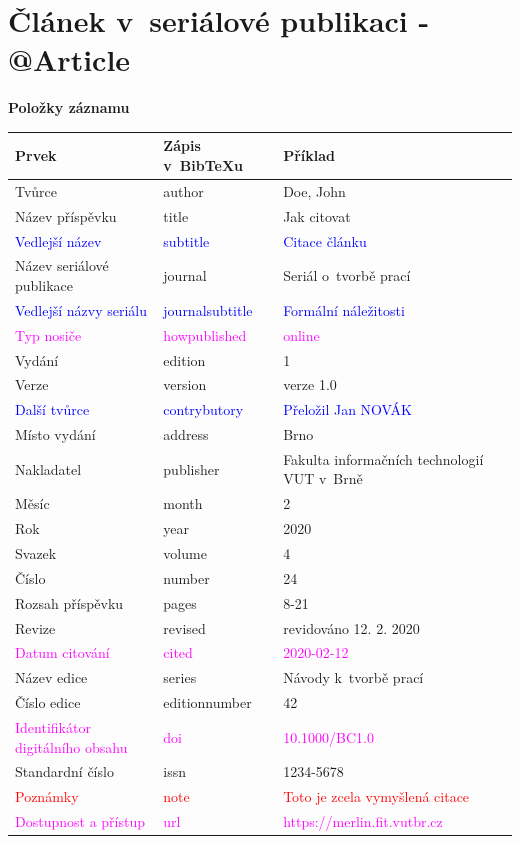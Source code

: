 \section*{Článek v~seriálové publikaci - @Article}
\label{pr-casopis-clanek}
\noindent \textbf{Položky záznamu}

\medskip

\begin{tabularx}{\linewidth}{X X X}
    Prvek & Zápis v~BibTeXu & Příklad \\\hline
    Tvůrce & author & Doe, John\\
    Název příspěvku & title & Jak citovat\\
    \textcolor{blue}{Vedlejší název} & \textcolor{blue}{subtitle} & \textcolor{blue}{Citace článku}\\
    Název seriálové publikace & journal & Seriál o~tvorbě prací\\
    \textcolor{blue}{Vedlejší názvy seriálu} & \textcolor{blue}{journalsubtitle} & \textcolor{blue}{Formální náležitosti}\\
    \textcolor{magenta}{Typ nosiče} & \textcolor{magenta}{howpublished} & \textcolor{magenta}{online}\\
    Vydání & edition & 1\\
    Verze & version & verze 1.0\\
    \textcolor{blue}{Další tvůrce} & \textcolor{blue}{contrybutory} & \textcolor{blue}{Přeložil Jan NOVÁK}\\
    Místo vydání & address & Brno\\
    Nakladatel & publisher & Fakulta informačních technologií VUT v~Brně\\
    Měsíc & month & 2\\
    Rok & year & 2020\\
    Svazek & volume & 4\\
    Číslo & number & 24\\
    Rozsah příspěvku & pages & 8-21\\
    Revize & revised & revidováno 12. 2. 2020\\
    \textcolor{magenta}{Datum citování} & \textcolor{magenta}{cited} & \textcolor{magenta}{2020-02-12}\\
    Název edice & series & Návody k~tvorbě prací\\
    Číslo edice & editionnumber & 42\\
    \textcolor{magenta}{Identifikátor digitálního obsahu} & \textcolor{magenta}{doi} & \textcolor{magenta}{10.1000/BC1.0}\\
    Standardní číslo  & issn & 1234-5678\\
    \textcolor{red}{Poznámky} & \textcolor{red}{note} & \textcolor{red}{Toto je zcela vymyšlená citace}\\
    \textcolor{magenta}{Dostupnost a přístup} & \textcolor{magenta}{url} & \textcolor{magenta}{https://merlin.fit.vutbr.cz}
\end{tabularx}

